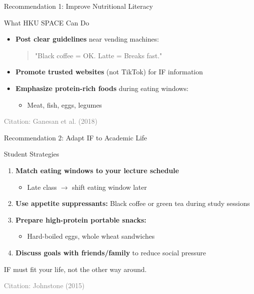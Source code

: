 \documentclass[aspectratio=169, 12pt]{beamer}
\begin{document}
\begin{frame}{Recommendation 1: Improve Nutritional Literacy}
  \begin{block}{\large What HKU SPACE Can Do}
    \begin{itemize}
      \item \textbf{Post clear guidelines} near vending machines:
      \begin{quote}
        "Black coffee = OK. Latte = Breaks fast."
      \end{quote}
      \item \textbf{Promote trusted websites} (not TikTok) for IF information
      \item \textbf{Emphasize protein-rich foods} during eating windows:
      \begin{itemize}
        \item Meat, fish, eggs, legumes
      \end{itemize}
    \end{itemize}
  \end{block}
  
  \vspace{0.3cm}
  \tiny \textcolor{gray}{Citation: Ganesan et al. (2018)}
\end{frame}

\begin{frame}{Recommendation 2: Adapt IF to Academic Life}
  \begin{block}{\large Student Strategies}
    \begin{enumerate}
      \item \textbf{Match eating windows to your lecture schedule}
      \begin{itemize}
        \item Late class $\rightarrow$ shift eating window later
      \end{itemize}
      \item \textbf{Use appetite suppressants:} Black coffee or green tea during study sessions
      \item \textbf{Prepare high-protein portable snacks:}
      \begin{itemize}
        \item Hard-boiled eggs, whole wheat sandwiches
      \end{itemize}
      \item \textbf{Discuss goals with friends/family} to reduce social pressure
    \end{enumerate}
  \end{block}
  
  \vspace{0.3cm}
  \begin{center}
    \large \textcolor{successGreen}{IF must fit your life, not the other way around.}
  \end{center}
  
  \tiny \textcolor{gray}{Citation: Johnstone (2015)}
\end{frame}
\end{document}

